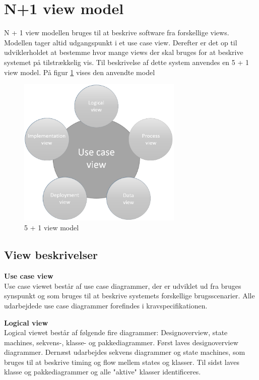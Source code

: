 \section{N+1 view model}

N + 1 view modellen bruges til at beskrive software fra forskellige views. Modellen tager altid udgangspunkt i et use case view. Derefter er det op til udviklerholdet at bestemme hvor mange views der skal bruges for at beskrive systemet på tilstrækkelig vis. Til beskrivelse af dette system anvendes en 5 + 1 view model. På figur \ref{fig:5 + 1 view model} vises den anvendte model


\vspace{-5pt}
\begin{figure}[H]
	\centering
	\includegraphics[width=0.7\textwidth]{Billeder/n+1}
	\vspace{0cm}
	\caption{5 + 1 view model}
	\label{fig:5 + 1 view model}
\end{figure}


\newpage

\subsection{View beskrivelser}

\textbf{Use case view}\\
Use case viewet består af use case diagrammer, der er udviklet ud fra bruges synspunkt og som bruges til at beskrive systemets forskellige brugsscenarier. Alle udarbejdede use case diagrammer forefindes i kravspecifikationen.

\textbf{Logical view}\\
Logical viewet består af følgende fire diagrammer: Designoverview, state machines, sekvens-, klasse- og pakkediagrammer. Først laves designoverview diagrammer. Dernæst udarbejdes sekvens diagrammer og state machines, som bruges til at beskrive timing og flow mellem states og klasser. Til sidst laves klasse og pakkediagrammer og alle "aktive" klasser identificeres. 

